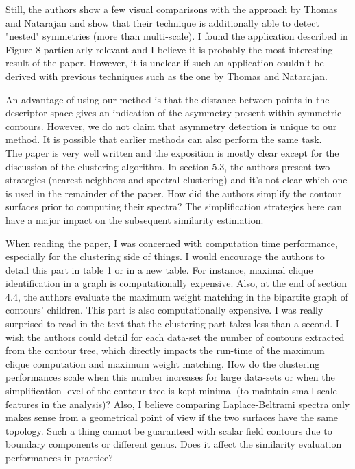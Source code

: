 \documentclass[10pt]{article}
\begin{document}
   Still, the authors show a few visual comparisons with the approach by
   Thomas and Natarajan and show that their technique is additionally able
   to detect "nested" symmetries (more than multi-scale).
   I found the application described in Figure 8 particularly relevant and I
   believe it is probably the most interesting result of the paper. However,
   it is unclear if such an application couldn't be derived with previous
   techniques such as the one by Thomas and Natarajan.

   {\color{blue}An advantage of using our method is that the distance between
	   points in the descriptor space gives an indication of the asymmetry
	   present within symmetric contours. However, we do not claim that
	   asymmetry detection is unique to our method. It is possible that
   earlier methods can also perform the same task.}\\

The paper is very well written and the exposition is mostly clear except
   for the discussion of the clustering algorithm. In section 5.3, the
   authors present two strategies (nearest neighbors and spectral
   clustering) and it's not clear which one is used in the remainder of the
   paper.
   How did the authors simplify the contour surfaces prior to computing
   their spectra? The simplification strategies here can have a major impact
   on the subsequent similarity estimation.

   When reading the paper, I was concerned with computation time
   performance, especially for the clustering side of things. I would
   encourage the authors to detail this part in table 1 or in a new table.
   For instance, maximal clique identification in a graph is computationally
   expensive. Also, at the end of section 4.4, the authors evaluate the
   maximum weight matching in the bipartite graph of contours' children.
   This part is also computationally expensive. I was really surprised to
   read in the text that the clustering part takes less than a 
   second. I wish the authors could detail for each data-set the number of 
   contours extracted from the contour tree, which directly impacts the
   run-time of the maximum clique computation and maximum weight matching.
   How do the clustering performances scale when this number increases for
   large data-sets or when the simplification level of the contour tree is
   kept minimal (to maintain small-scale features in the analysis)?
   Also, I believe comparing Laplace-Beltrami spectra only makes sense from
   a geometrical point of view if the two surfaces have the same topology.
   Such a thing cannot be guaranteed with scalar field contours due to
   boundary components or different genus. Does it affect the similarity
   evaluation performances in practice?
\end{document}
